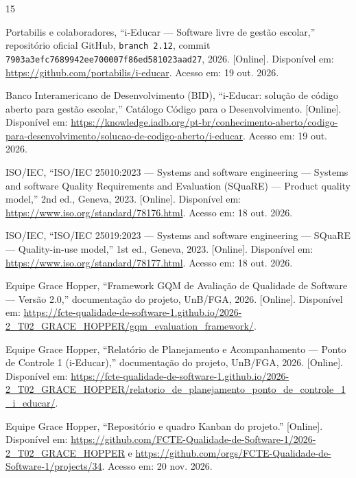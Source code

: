 \documentclass[conference]{model/IEEEtran}%
\begin{document}
\begin{thebibliography}{15}

Portabilis e colaboradores, ``i-Educar --- Software livre de gest\~ao escolar,'' reposit\'orio oficial GitHub, \texttt{branch 2.12}, commit \texttt{7903a3efc7689942ee700007f86ed581023aad27}, 2026. [Online]. Dispon\'ivel em: \url{https://github.com/portabilis/i-educar}. Acesso em: 19 out. 2026.

Banco Interamericano de Desenvolvimento (BID), ``i-Educar: solu\c{c}\~ao de c\'odigo aberto para gest\~ao escolar,'' Cat\'alogo C\'odigo para o Desenvolvimento. [Online]. Dispon\'ivel em: \url{https://knowledge.iadb.org/pt-br/conhecimento-aberto/codigo-para-desenvolvimento/solucao-de-codigo-aberto/i-educar}. Acesso em: 19 out. 2026.

ISO/IEC, ``ISO/IEC 25010:2023 --- Systems and software engineering --- Systems and software Quality Requirements and Evaluation (SQuaRE) --- Product quality model,'' 2nd ed., Geneva, 2023. [Online]. Dispon\'ivel em: \url{https://www.iso.org/standard/78176.html}. Acesso em: 18 out. 2026.

ISO/IEC, ``ISO/IEC 25019:2023 --- Systems and software engineering --- SQuaRE --- Quality-in-use model,'' 1st ed., Geneva, 2023. [Online]. Dispon\'ivel em: \url{https://www.iso.org/standard/78177.html}. Acesso em: 18 out. 2026.

Equipe Grace Hopper, ``Framework GQM de Avalia\c{c}\~ao de Qualidade de Software --- Vers\~ao 2.0,'' documenta\c{c}\~ao do projeto, UnB/FGA, 2026. [Online]. Dispon\'ivel em: \url{https://fcte-qualidade-de-software-1.github.io/2026-2_T02_GRACE_HOPPER/gqm_evaluation_framework/}.

Equipe Grace Hopper, ``Relat\'orio de Planejamento e Acompanhamento --- Ponto de Controle 1 (i-Educar),'' documenta\c{c}\~ao do projeto, UnB/FGA, 2026. [Online]. Dispon\'ivel em: \url{https://fcte-qualidade-de-software-1.github.io/2026-2_T02_GRACE_HOPPER/relatorio_de_planejamento_ponto_de_controle_1_i_educar/}.

Equipe Grace Hopper, ``Reposit\'orio e quadro Kanban do projeto.'' [Online]. Dispon\'ivel em: \url{https://github.com/FCTE-Qualidade-de-Software-1/2026-2_T02_GRACE_HOPPER} e \url{https://github.com/orgs/FCTE-Qualidade-de-Software-1/projects/34}. Acesso em: 20 nov. 2026.


\end{thebibliography}
\end{document}
